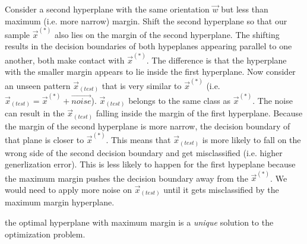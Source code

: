 \begin{frame}
{            Consider a second hyperplane with the same orientation $\vec w$ but less than maximum (i.e. more narrow) margin. Shift the second hyperplane so that our sample $\vec x^{(*)}$ also lies on the margin of the second hyperplane. The shifting results in the decision boundaries of both hypeplanes appearing parallel to one another, both make contact with $\vec x^{(*)}$. The difference is that the hyperplane with the smaller margin appears to lie inside the first hyperplane. Now consider an unseen pattern $\vec x_{(test)}$ that is very similar to $\vec x^{(*)}$ (i.e. $\vec x_{(test)} = \vec x^{(*)} + \vec {noise}$). $\vec x_{(test)}$ belongs to the same class as $\vec x^{(*)}$. The noise can result in the $\vec x_{(test)}$ falling inside the margin of the first hyperplane. Because the margin of the second hyperplane is more narrow, the decision boundary of that plane is closer to $\vec x^{(*)}$. This means that $\vec x_{(test)}$ is more likely to fall on the wrong side of the second decision boundary and get misclassified (i.e. higher generlization error). This is less likely to happen for the first hypeplane because the maximum margin pushes the decision boundary away from the $\vec x^{(*)}$. We would need to apply more noise on $\vec x_{(test)}$  until it gets misclassified by the maximum margin hyperplane.\vspace{5cm}
            
}
         the optimal hyperplane with maximum margin is a \emph{unique} solution to the optimization problem.
    
\end{frame}

